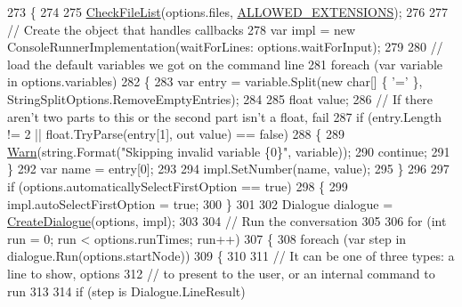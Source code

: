 \begin{DoxyCode}
273         \{
274 
275             \hyperlink{a00185_ad77564b25725a771f0fd4da430582e6f}{CheckFileList}(options.files, \hyperlink{a00185_a0979de7ea02c8c0375b8220a12e6575e}{ALLOWED\_EXTENSIONS});
276 
277             \textcolor{comment}{// Create the object that handles callbacks}
278             var impl = \textcolor{keyword}{new} ConsoleRunnerImplementation(waitForLines: options.waitForInput);
279 
280             \textcolor{comment}{// load the default variables we got on the command line}
281             \textcolor{keywordflow}{foreach} (var variable \textcolor{keywordflow}{in} options.variables)
282             \{
283                 var entry = variable.Split(\textcolor{keyword}{new} \textcolor{keywordtype}{char}[] \{ \textcolor{charliteral}{'='} \}, StringSplitOptions.RemoveEmptyEntries);
284 
285                 \textcolor{keywordtype}{float} value;
286                 \textcolor{comment}{// If there aren't two parts to this or the second part isn't a float, fail}
287                 \textcolor{keywordflow}{if} (entry.Length != 2 || \textcolor{keywordtype}{float}.TryParse(entry[1], out value) == \textcolor{keyword}{false})
288                 \{
289                     \hyperlink{a00185_a979bb6f049b6c5294f745a19e24ddd9d}{Warn}(\textcolor{keywordtype}{string}.Format(\textcolor{stringliteral}{"Skipping invalid variable \{0\}"}, variable));
290                     \textcolor{keywordflow}{continue};
291                 \}
292                 var name = entry[0];
293 
294                 impl.SetNumber(name, value);
295             \}
296 
297             \textcolor{keywordflow}{if} (options.automaticallySelectFirstOption == \textcolor{keyword}{true})
298             \{
299                 impl.autoSelectFirstOption = \textcolor{keyword}{true};
300             \}
301 
302             Dialogue dialogue = \hyperlink{a00185_aab244361a510cee18ad2f636d110e0d5}{CreateDialogue}(options, impl);
303 
304             \textcolor{comment}{// Run the conversation}
305 
306             \textcolor{keywordflow}{for} (\textcolor{keywordtype}{int} run = 0; run < options.runTimes; run++)
307             \{
308                 \textcolor{keywordflow}{foreach} (var step \textcolor{keywordflow}{in} dialogue.Run(options.startNode))
309                 \{
310 
311                     \textcolor{comment}{// It can be one of three types: a line to show, options}
312                     \textcolor{comment}{// to present to the user, or an internal command to run}
313 
314                     \textcolor{keywordflow}{if} (step is Dialogue.LineResult)

\end{DoxyCode}
